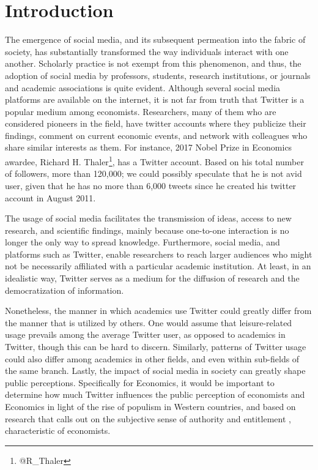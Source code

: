 \documentclass[12pt,english]{article}
\begin{document}
\section{Introduction}\label{sec:intro}
The emergence of social media, and its subsequent permeation into the fabric of society, has substantially transformed the way individuals interact with one another. Scholarly practice is not exempt from this phenomenon, and thus, the adoption of social media by professors, students, research institutions, or journals and academic associations is quite evident. Although several social media platforms are available on the internet, it is not far from truth that Twitter is a popular medium among economists. Researchers, many of them who are considered pioneers in the field, have twitter accounts where they publicize their findings, comment on current economic events, and network with colleagues who share similar interests as them. For instance, 2017 Nobel Prize in Economics awardee, Richard H. Thaler\footnote{@R\_{T}haler}, has a Twitter account. Based on his total number of followers, more than 120,000; we could possibly speculate that he is not avid user, given that he has no more than 6,000 tweets since he created his twitter account in August 2011. 

The usage of social media facilitates the transmission of ideas, access to new research, and scientific findings, mainly because one-to-one interaction is no longer the only way to spread knowledge. Furthermore, social media, and platforms such as Twitter, enable researchers to reach larger audiences who might not be necessarily affiliated with a particular academic institution. At least, in an idealistic way, Twitter serves as a medium for the diffusion of research and the democratization of information. 

Nonetheless, the manner in which academics use Twitter could greatly differ from the manner that is utilized by others. One would assume that leisure-related usage prevails among the average Twitter user, as opposed to academics in Twitter, though this can be hard to discern. Similarly, patterns of Twitter usage could also differ among academics in other fields, and even within sub-fields of the same branch. Lastly, the impact of social media in society can greatly shape public perceptions. Specifically for Economics, it would be important to determine how much Twitter influences the public perception of economists and Economics in light of the rise of populism in Western countries, and based on research that calls out on the subjective sense of authority and entitlement \citep{superiority}, characteristic of economists. 
\end{document}
